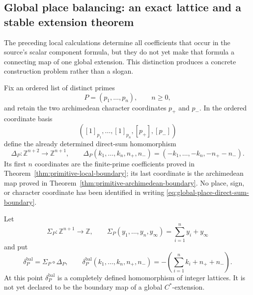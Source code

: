 \subsection{Global place balancing: an exact lattice and a stable extension
theorem}

The preceding local calculations determine all coefficients that occur in the
source's scalar component formula, but they do not yet make that formula a
connecting map of one global extension.  This distinction produces a concrete
construction problem rather than a slogan.

Fix an ordered list of distinct primes
\[
 P=(p_1,\ldots,p_n),\qquad n\geq0,
\]
and retain the two archimedean character coordinates $p_+$ and $p_-$.  In the
ordered coordinate basis
\[
 ( [1]_{p_1},\ldots,[1]_{p_n},[p_+],[p_-])
\]
define the already determined direct-sum homomorphism
\begin{equation}
 \Delta_P:\mathbb Z^{n+2}\longrightarrow\mathbb Z^{n+1},
 \qquad
 \Delta_P(k_1,\ldots,k_n,n_+,n_-)
 =(-k_1,\ldots,-k_n,-n_+-n_-).
 \label{eq:global-place-direct-sum-boundary}
\end{equation}
Its first $n$ coordinates are the finite-prime coefficients proved in
Theorem~\ref{thm:primitive-local-boundary}; its last coordinate is the
archimedean map proved in
Theorem~\ref{thm:primitive-archimedean-boundary}.  No place, sign, or
character coordinate has been identified in writing
\eqref{eq:global-place-direct-sum-boundary}.

Let
\begin{equation}
 \Sigma_P:\mathbb Z^{n+1}\longrightarrow\mathbb Z,
 \qquad
 \Sigma_P(y_1,\ldots,y_n,y_\infty)
 =\sum_{i=1}^{n}y_i+y_\infty
 \label{eq:global-place-codiagonal}
\end{equation}
and put
\begin{equation}
 \delta_P^{\mathrm{bal}}=\Sigma_P\circ\Delta_P,
 \qquad
 \delta_P^{\mathrm{bal}}(k_1,\ldots,k_n,n_+,n_-)
 =-\left(\sum_{i=1}^{n}k_i+n_++n_-\right).
 \label{eq:global-place-balancing-row}
\end{equation}
At this point $\delta_P^{\mathrm{bal}}$ is a completely defined homomorphism of
integer lattices.  It is not yet declared to be the boundary map of a global
$C^*$-extension.

